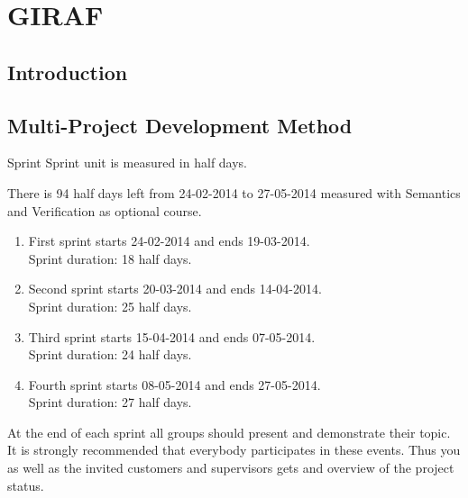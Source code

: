 \chapter{GIRAF}\label{chap:giraf}

\section{Introduction}\label{sec:giraf:introduction}

\section{Multi-Project Development Method}\label{sec:giraf:development}


Sprint
Sprint unit is measured in half days.

There is 94 half days left from 24-02-2014 to 27-05-2014 measured with Semantics and Verification as optional course.

\begin{enumerate}
\item First sprint starts 24-02-2014 and ends 19-03-2014.\\
Sprint duration: 18 half days.
\item Second sprint starts 20-03-2014 and ends 14-04-2014.\\
Sprint duration: 25 half days.
\item Third sprint starts 15-04-2014 and ends 07-05-2014.\\
Sprint duration: 24 half days.
\item Fourth sprint starts 08-05-2014 and ends 27-05-2014.\\
Sprint duration: 27 half days.
\end{enumerate}

At the end of each sprint all groups should present and demonstrate their topic.
It is strongly recommended that everybody participates in these events. Thus you as well as the invited customers and supervisors gets and overview of the project status.
